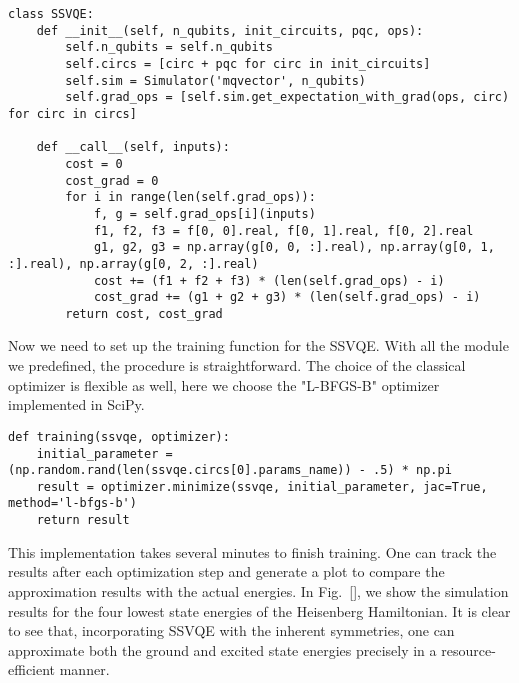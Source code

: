 \begin{lstlisting}
class SSVQE:
    def __init__(self, n_qubits, init_circuits, pqc, ops):
        self.n_qubits = self.n_qubits
        self.circs = [circ + pqc for circ in init_circuits]
        self.sim = Simulator('mqvector', n_qubits)
        self.grad_ops = [self.sim.get_expectation_with_grad(ops, circ) for circ in circs]

    def __call__(self, inputs):
        cost = 0
        cost_grad = 0
        for i in range(len(self.grad_ops)):
            f, g = self.grad_ops[i](inputs)
            f1, f2, f3 = f[0, 0].real, f[0, 1].real, f[0, 2].real
            g1, g2, g3 = np.array(g[0, 0, :].real), np.array(g[0, 1, :].real), np.array(g[0, 2, :].real)
            cost += (f1 + f2 + f3) * (len(self.grad_ops) - i)
            cost_grad += (g1 + g2 + g3) * (len(self.grad_ops) - i)
        return cost, cost_grad
\end{lstlisting}

Now we need to set up the training function for the SSVQE. With all the module we predefined, the procedure is straightforward. The choice of the classical optimizer is flexible as well, here we choose the "L-BFGS-B" optimizer implemented in SciPy.

\begin{lstlisting}
def training(ssvqe, optimizer):
    initial_parameter = (np.random.rand(len(ssvqe.circs[0].params_name)) - .5) * np.pi
    result = optimizer.minimize(ssvqe, initial_parameter, jac=True, method='l-bfgs-b')
    return result
\end{lstlisting}

This implementation takes several minutes to finish training. One can track the results after each optimization step and generate a plot to compare the approximation results with the actual energies. In Fig.~\ref{}, we show the simulation results for the four lowest state energies of the Heisenberg Hamiltonian. It is clear to see that, incorporating SSVQE with the inherent symmetries, one can approximate both the ground and excited state energies precisely in a resource-efficient manner.
